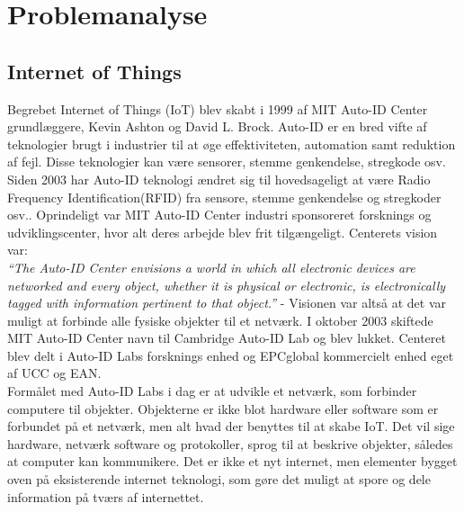 \chapter{Problemanalyse}

    
    
    \section{Internet of Things}
        Begrebet Internet of Things (IoT) blev skabt i 1999 af MIT Auto-ID Center grundlæggere, Kevin Ashton og David L. Brock.\autocite{Hashmi2017} Auto-ID er en bred vifte af teknologier brugt i industrier til at øge effektiviteten, automation samt reduktion af fejl. Disse teknologier kan være sensorer, stemme genkendelse, stregkode osv.
        Siden 2003 har Auto-ID teknologi ændret sig til hovedsageligt at være Radio Frequency Identification(RFID) fra sensore, stemme genkendelse og stregkoder osv.\autocite{Sundmaeker2010}. Oprindeligt var MIT Auto-ID Center industri sponsoreret forsknings og udviklingscenter, hvor alt deres arbejde blev frit tilgængeligt. Centerets vision var:\\
        \textit{``The Auto-ID Center envisions a world in which all electronic devices are networked and every object, whether it is physical or electronic, is electronically tagged with information pertinent to that object.''} -\autocite[Kapitel 2,p. ~4]{Sarma2001} Visionen var altså at det var muligt at forbinde alle fysiske objekter til et netværk. 
        I oktober 2003 skiftede MIT Auto-ID Center navn til Cambridge Auto-ID Lab og blev lukket. Centeret blev delt i Auto-ID Labs forsknings enhed og EPCglobal kommercielt enhed eget af UCC og EAN.\autocite{Sundmaeker2010}\\
        Formålet med Auto-ID Labs i dag er at udvikle et netværk, som forbinder computere til objekter. Objekterne er ikke blot hardware eller software som er forbundet på et netværk, men alt hvad der benyttes til at skabe IoT. Det vil sige hardware, netværk software og protokoller, sprog til at beskrive objekter, således at computer kan kommunikere. Det er ikke et nyt internet, men elementer bygget oven på eksisterende internet teknologi, som gøre det muligt at spore og dele information på tværs af internettet.\autocite{Sundmaeker2010} \\
